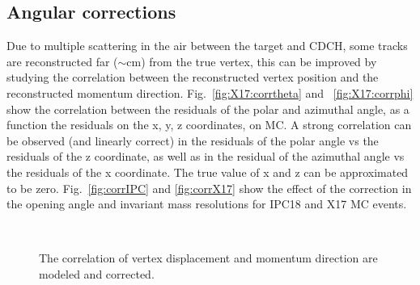 \begin{refsection}
        \subsection{Angular corrections}
        Due to multiple scattering in the air between the target and CDCH, some tracks are reconstructed far ($\sim$cm) from the true vertex, this can be improved by studying the correlation between the reconstructed vertex position and the reconstructed momentum direction. 
        Fig.~\ref{fig:X17:corrtheta} and ~\ref{fig:X17:corrphi} show the correlation between the residuals of the polar and azimuthal angle, as a function the residuals on the x, y, z coordinates, on MC. 
        A strong correlation can be observed (and linearly correct) in the residuals of the polar angle vs the residuals of the z coordinate, as well as in the residual of the azimuthal angle vs the residuals of the x coordinate.  
        The true value of x and z can be approximated to be zero.
        Fig.~\ref{fig:corrIPC} and \ref{fig:corrX17} show the effect of the correction in the opening angle and invariant mass resolutions for IPC18 and X17 MC events.
        
        \begin{figure}
            \centering
            \\\vspace{1cm}
            \caption[X17: Angular correlations]{The correlation of vertex displacement and momentum direction are modeled and corrected.}
        \end{figure}
        



\end{refsection}
